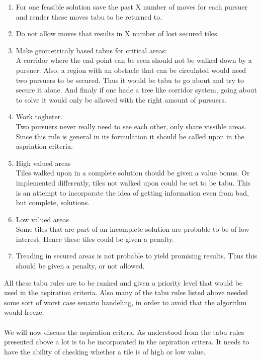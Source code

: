 \begin{enumerate}
\item{}For one feasible solution save the past X number of moves for each pursuer and render these moves tabu to be returned to.
\item{}Do not allow moves that results in X number of lost secured tiles.
\item{}Make geometricaly based tabus for critical areas:\vspace{0,1cm}\\
A corridor where the end point can be seen should not be walked down by a pursuer. Also, a region with an obstacle that can be circulated would need two pursuers to be secured. Thus it would be tabu to go about and try to secure it alone. And finaly if one hade a tree like corridor system, going about to solve it would only be allowed with the right amount of pursuers.
\item{} Work togheter. \vspace{0,1cm}\\
Two pursuers never really need to see each other, only share vissible areas. Since this rule is general in its formulation it should be called upon in the aspriation criteria.
\item{} High valued areas \vspace{0,1cm}\\
Tiles walked upon in a complete solution should be given a value bonus. Or implemented differently, tiles not walked upon could be set to be tabu. This is an attempt to incorporate the idea of getting information even from bad, but complete, solutions.
\item{} Low valued areas \vspace{0,1cm}\\
Some tiles that are part of an incomplete solution are probable to be of low interest. Hence these tiles could be given a penalty.
\item{} Treading in secured areas is not probable to yield promising results. Thus this should be given a penalty, or not allowed.
\end{enumerate}

All these tabu rules are to be ranked and given a priority level that would be used in the aspiration criteria. Also many of the tabu rules listed above needed some sort of worst case senario handeling, in order to avoid that the algorithm would freeze.\\
\\We will now discuss the aspiration critera. As understood from the tabu rules presented above a lot is to be incorporated in the aspiration critera. It needs to have the ability of checking whether a tile is of high or low value.

